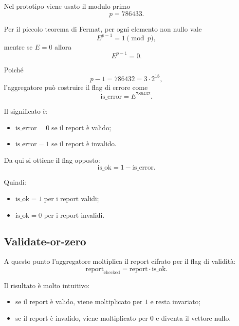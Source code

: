 Nel prototipo viene usato il modulo primo
\begin{equation}
p = 786433.
\end{equation}

Per il piccolo teorema di Fermat, per ogni elemento non nullo vale
\begin{equation}
E^{p-1} = 1 \pmod p,
\end{equation}
mentre se $E=0$ allora
\begin{equation}
E^{p-1} = 0.
\end{equation}

Poich\'e
\begin{equation}
p-1 = 786432 = 3 \cdot 2^{18},
\end{equation}
l'aggregatore pu\`o costruire il flag di errore come
\begin{equation}
\text{is\_error} = E^{786432}.
\end{equation}

Il significato \`e:
\begin{itemize}
  \item $\text{is\_error}=0$ se il report \`e valido;
  \item $\text{is\_error}=1$ se il report \`e invalido.
\end{itemize}

Da qui si ottiene il flag opposto:
\begin{equation}
\text{is\_ok} = 1 - \text{is\_error}.
\end{equation}

Quindi:
\begin{itemize}
  \item $\text{is\_ok}=1$ per i report validi;
  \item $\text{is\_ok}=0$ per i report invalidi.
\end{itemize}

\subsection{Validate-or-zero}
A questo punto l'aggregatore moltiplica il report cifrato per il flag di validit\`a:
\begin{equation}
\text{report}_{\text{checked}} = \text{report} \cdot \text{is\_ok}.
\end{equation}

Il risultato \`e molto intuitivo:
\begin{itemize}
  \item se il report \`e valido, viene moltiplicato per $1$ e resta invariato;
  \item se il report \`e invalido, viene moltiplicato per $0$ e diventa il vettore nullo.
\end{itemize}

